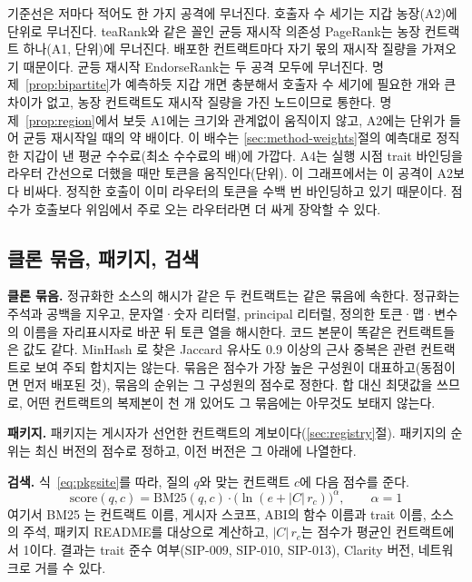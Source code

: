 기준선은 저마다 적어도 한 가지 공격에 무너진다. 호출자 수 세기는 지갑 농장(A2)에 \ToyCostCallersATwo 단위로 무너진다. teaRank와 같은 꼴인 균등 재시작 의존성 PageRank는 농장 컨트랙트 하나(A1, \ToyCostDepPRAOne 단위)에 무너진다. 배포한 컨트랙트마다 자기 몫의 재시작 질량을 가져오기 때문이다. 균등 재시작 EndorseRank는 두 공격 모두에 무너진다. 명제~\ref{prop:bipartite}가 예측하듯 지갑 \ToyCostERUniformATwo 개면 충분해서 호출자 수 세기에 필요한 \ToyCostCallersATwo 개와 큰 차이가 없고, 농장 컨트랙트도 재시작 질량을 가진 노드이므로 통한다.  명제~\ref{prop:region}에서 보듯 A1에는 크기와 관계없이 움직이지 않고, A2에는 \ToyCostPCERATwo 단위가 들어 균등 재시작일 때의 약 \ToyRatioATwo 배이다. 이 배수는 \ref{sec:method-weights}절의 예측대로 정직한 지갑이 낸 평균 수수료(최소 수수료의 \ToyMeanFee 배)에 가깝다. A4는 실행 시점 trait 바인딩을 라우터 간선으로 더했을 때만 토큰을 움직인다(\ToyCostPCERBindAFour 단위). 이 그래프에서는 이 공격이 A2보다 비싸다. 정직한 호출이 이미 라우터의 토큰을 수백 번 바인딩하고 있기 때문이다. 점수가 호출보다 위임에서 주로 오는 라우터라면 더 싸게 장악할 수 있다.

\subsection{클론 묶음, 패키지, 검색}
\label{sec:method-search}

\textbf{클론 묶음.} 정규화한 소스의 해시가 같은 두 컨트랙트는 같은 묶음에 속한다. 정규화는 주석과 공백을 지우고, 문자열·숫자 리터럴, principal 리터럴, 정의한 토큰·맵·변수의 이름을 자리표시자로 바꾼 뒤 토큰 열을 해시한다. 코드 본문이 똑같은 컨트랙트들은  값도 같다. MinHash \cite{broder1997resemblance}로 찾은 Jaccard 유사도 0.9 이상의 근사 중복은 관련 컨트랙트로 보여 주되 합치지는 않는다. 묶음은 점수가 가장 높은 구성원이 대표하고(동점이면 먼저 배포된 것), 묶음의 순위는 그 구성원의 점수로 정한다. 합 대신 최댓값을 쓰므로, 어떤 컨트랙트의 복제본이 천 개 있어도 그 묶음에는 아무것도 보태지 않는다.

\textbf{패키지.} 패키지는 게시자가 선언한 컨트랙트의 계보이다(\ref{sec:registry}절). 패키지의 순위는 최신 버전의 점수로 정하고, 이전 버전은 그 아래에 나열한다.

\textbf{검색.} 식~\eqref{eq:pkgsite}를 따라, 질의 $q$와 맞는 컨트랙트 $c$에 다음 점수를 준다.
\begin{equation}
\label{eq:search}
\mathrm{score}(q,c)=\mathrm{BM25}(q,c)\cdot\bigl(\ln(e+|C|\,r_c)\bigr)^{\alpha},\qquad \alpha=1
\end{equation}
여기서 BM25 \cite{robertson2009bm25}는 컨트랙트 이름, 게시자 스코프, ABI의 함수 이름과 trait 이름, 소스의 주석, 패키지 README를 대상으로 계산하고, $|C|\,r_c$는 점수가 평균인 컨트랙트에서 1이다. 결과는 trait 준수 여부(SIP-009, SIP-010, SIP-013), Clarity 버전, 네트워크로 거를 수 있다.
